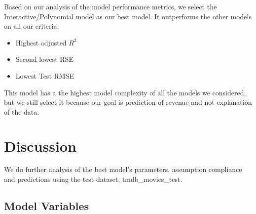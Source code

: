 \documentclass[
]{article}
\newenvironment{Shaded}{\begin{snugshade}}{\end{snugshade}}
\newcommand{\DecValTok}[1]{\textcolor[rgb]{0.00,0.00,0.81}{#1}}
\newcommand{\KeywordTok}[1]{\textcolor[rgb]{0.13,0.29,0.53}{\textbf{#1}}}
\newcommand{\NormalTok}[1]{#1}
\newcommand{\OperatorTok}[1]{\textcolor[rgb]{0.81,0.36,0.00}{\textbf{#1}}}
\newcommand{\StringTok}[1]{\textcolor[rgb]{0.31,0.60,0.02}{#1}}
\providecommand{\tightlist}{%
  \setlength{\itemsep}{0pt}\setlength{\parskip}{0pt}}
\begin{document}
Based on our analysis of the model performance metrics, we select the
Interactive/Polynomial model as our best model. It outperforms the other
models on all our criteria:

\begin{itemize}
\tightlist
\item
  Highest adjusted \(R^2\)
\item
  Second lowest RSE
\item
  Lowest Test RMSE
\end{itemize}

This model has a the highest model complexity of all the models we
considered, but we still select it because our goal is prediction of
revenue and not explanation of the data.

\begin{Shaded}
\end{Shaded}

\hypertarget{discussion}{%
\section{Discussion}\label{discussion}}

We do further analysis of the best model's parameters, assumption
compliance and predictions using the test dataset, tmdb\_movies\_test.

\hypertarget{model-variables}{%
\subsection{Model Variables}\label{model-variables}}
\end{document}
